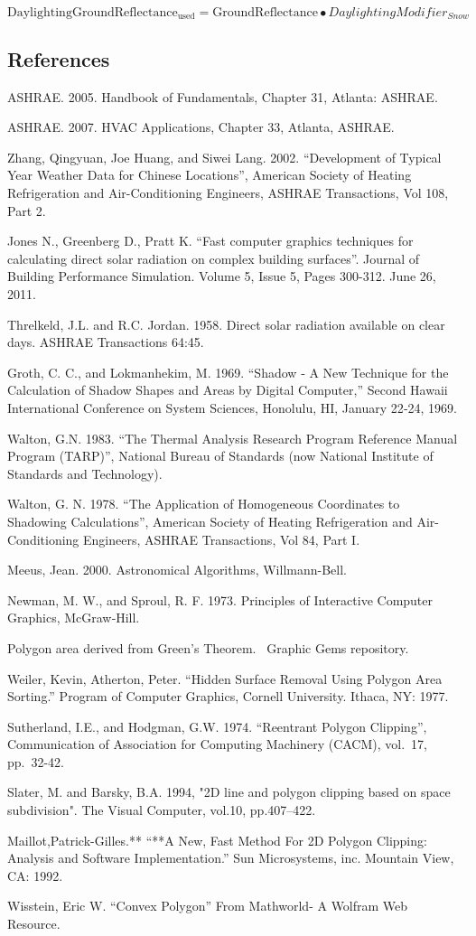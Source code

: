 \begin{equation}
{\mathrm{DaylightingGroundReflectanc}}{{\mathrm{e}}_{{\mathrm{used}}}} = {\mathrm{GroundReflectance}} \bullet DaylightingModifie{r_{Snow}}
\end{equation}

\subsection{References}\label{references-041}

ASHRAE. 2005. Handbook of Fundamentals, Chapter 31, Atlanta: ASHRAE.

ASHRAE. 2007. HVAC Applications, Chapter 33, Atlanta, ASHRAE.

Zhang, Qingyuan, Joe Huang, and Siwei Lang. 2002. ``Development of Typical Year Weather Data for Chinese Locations'', American Society of Heating Refrigeration and Air-Conditioning Engineers, ASHRAE Transactions, Vol 108, Part 2.

Jones N., Greenberg D., Pratt K. ``Fast computer graphics techniques for calculating direct solar radiation on complex building surfaces''. Journal of Building Performance Simulation. Volume 5, Issue 5, Pages 300-312. June 26, 2011.

Threlkeld, J.L. and R.C. Jordan. 1958. Direct solar radiation available on clear days. ASHRAE Transactions 64:45.

Groth, C. C., and Lokmanhekim, M. 1969. ``Shadow ‑ A New Technique for the Calculation of Shadow Shapes and Areas by Digital Computer,'' Second Hawaii International Conference on System Sciences, Honolulu, HI, January 22‑24, 1969.

Walton, G.N. 1983. ``The Thermal Analysis Research Program Reference Manual Program (TARP)'', National Bureau of Standards (now National Institute of Standards and Technology).

Walton, G. N. 1978. ``The Application of Homogeneous Coordinates to Shadowing Calculations'', American Society of Heating Refrigeration and Air-Conditioning Engineers, ASHRAE Transactions, Vol 84, Part I.

Meeus, Jean. 2000. Astronomical Algorithms, Willmann-Bell.

Newman, M. W., and Sproul, R. F. 1973. Principles of Interactive Computer Graphics, McGraw‑Hill.

Polygon area derived from Green's Theorem.~ Graphic Gems repository.

Weiler, Kevin, Atherton, Peter. ``Hidden Surface Removal Using Polygon Area Sorting.'' Program of Computer Graphics, Cornell University. Ithaca, NY: 1977.

Sutherland, I.E., and Hodgman, G.W. 1974. ``Reentrant Polygon Clipping'', Communication of Association for Computing Machinery (CACM), vol.~17, pp.~32-42.

Slater, M. and Barsky, B.A. 1994, "2D line and polygon clipping based on space subdivision". The Visual Computer, vol.10, pp.407–422.

Maillot,Patrick-Gilles.** ``**A New, Fast Method For 2D Polygon Clipping: Analysis and Software Implementation.'' Sun Microsystems, inc. Mountain View, CA: 1992.

Wisstein, Eric W. ``Convex Polygon'' From Mathworld- A Wolfram Web Resource.
